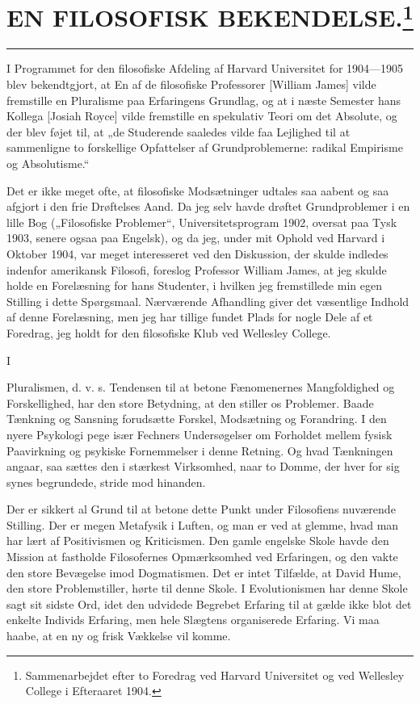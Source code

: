 \documentclass[12pt,a4paper,openany]{book}
\newcommand{\opage}[1]{\marginnote{\footnotesize\textit{[#1]}}}
\newcommand{\essay}[2][]{\chapter*{#2}\addcontentsline{toc}{chapter}{#1}}   %
\newcommand{\streg}{\begin{center}\rule{3em}{0.4pt}\end{center}}
\begin{document}
\setcounter{footnote}{0}%
\opage{18}\essay[En filosofisk Bekendelse (1904)]{EN FILOSOFISK BEKENDELSE.\footnote[1]{Sammenarbejdet efter to Foredrag ved Harvard Universitet og ved Wellesley College i Efteraaret 1904.}}
\streg

I Programmet for den filosofiske Afdeling af Harvard Universitet
for 1904---1905 blev bekendtgjort, at En af de filosofiske Professorer
[William James] vilde fremstille en Pluralisme paa Erfaringens
Grundlag, og at i næste Semester hans Kollega [Josiah
Royce] vilde fremstille en spekulativ Teori om det Absolute, og
der blev føjet til, at „de Studerende saaledes vilde faa Lejlighed
til at sammenligne to forskellige Opfattelser af Grundproblemerne:
radikal Empirisme og Absolutisme.“

Det er ikke meget ofte, at filosofiske Modsætninger udtales
saa aabent og saa afgjort i den frie Drøftelses Aand. Da jeg
selv havde drøftet Grundproblemer i en lille Bog („Filosofiske
Problemer“, Universitetsprogram 1902, oversat paa Tysk 1903,
senere ogsaa paa Engelsk), og da jeg, under mit Ophold ved
Harvard i Oktober 1904, var meget interesseret ved den Diskussion,
der skulde indledes indenfor amerikansk Filosofi, foreslog
Professor William James, at jeg skulde holde en Forelæsning
for hans Studenter, i hvilken jeg fremstillede min egen
Stilling i dette Spørgsmaal. Nærværende Afhandling giver det
væsentlige Indhold af denne Forelæsning, men jeg har tillige
fundet Plads for nogle Dele af et Foredrag, jeg holdt for den
filosofiske Klub ved Wellesley College.

\setcounter{footnote}{0}%
\opage{19}\begin{center}I\end{center}


Pluralismen, d. v. s. Tendensen til at betone Fænomenernes
Mangfoldighed og Forskellighed, har den store Betydning, at den
stiller os Problemer. Baade Tænkning og Sansning forudsætte
Forskel, Modsætning og Forandring. I den nyere Psykologi pege
især Fechners Undersøgelser om Forholdet mellem fysisk Paavirkning
og psykiske Fornemmelser i denne Retning. Og hvad
Tænkningen angaar, saa sættes den i stærkest Virksomhed, naar
to Domme, der hver for sig synes begrundede, stride mod hinanden.


Der er sikkert al Grund til at betone dette Punkt under
Filosofiens nuværende Stilling. Der er megen Metafysik i Luften,
og man er ved at glemme, hvad man har lært af Positivismen
og Kriticismen. Den gamle engelske Skole havde den Mission
at fastholde Filosofernes Opmærksomhed ved Erfaringen, og den
vakte den store Bevægelse imod Dogmatismen. Det er intet
Tilfælde, at David Hume, den store Problemstiller, hørte til denne
Skole. I Evolutionismen har denne Skole sagt sit sidste Ord,
idet den udvidede Begrebet Erfaring til at gælde ikke blot det
enkelte Individs Erfaring, men hele Slægtens organiserede Erfaring.
Vi maa haabe, at en ny og frisk Vækkelse vil komme.
\end{document}
